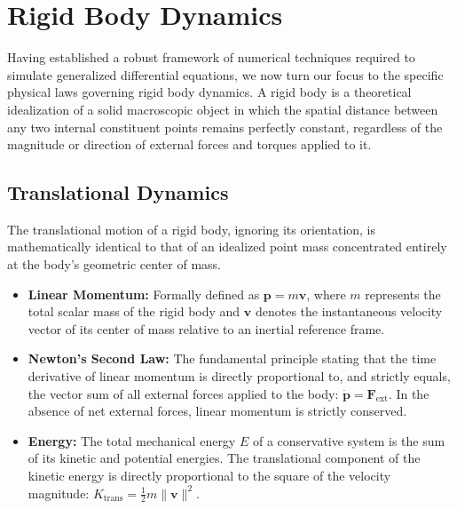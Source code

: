 \section{Rigid Body Dynamics}
Having established a robust framework of numerical techniques required to simulate generalized differential equations, we now turn our focus to the specific physical laws governing rigid body dynamics. A rigid body is a theoretical idealization of a solid macroscopic object in which the spatial distance between any two internal constituent points remains perfectly constant, regardless of the magnitude or direction of external forces and torques applied to it.

\subsection{Translational Dynamics}
The translational motion of a rigid body, ignoring its orientation, is mathematically identical to that of an idealized point mass concentrated entirely at the body's geometric center of mass.
\begin{itemize}
    \item \textbf{Linear Momentum:} Formally defined as $\bm{p} = m \bm{v}$, where $m$ represents the total scalar mass of the rigid body and $\bm{v}$ denotes the instantaneous velocity vector of its center of mass relative to an inertial reference frame.
    \item \textbf{Newton's Second Law:} The fundamental principle stating that the time derivative of linear momentum is directly proportional to, and strictly equals, the vector sum of all external forces applied to the body: $\dot{\bm{p}} = \bm{F}_{\text{ext}}$. In the absence of net external forces, linear momentum is strictly conserved.
    \item \textbf{Energy:} The total mechanical energy $E$ of a conservative system is the sum of its kinetic and potential energies. The translational component of the kinetic energy is directly proportional to the square of the velocity magnitude: $K_{\text{trans}} = \frac{1}{2} m \|\bm{v}\|^2$.
\end{itemize}

